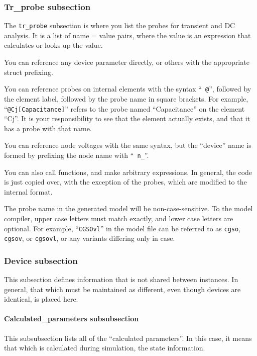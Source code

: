 \subsubsection{Tr\_probe subsection}

The {\tt tr\_probe} subsection is where you list the probes for
transient and DC analysis.  It is a list of name = value pairs, where
the value is an expression that calculates or looks up the value.

You can reference any device parameter directly, or others with the
appropriate struct prefixing.

You can reference probes on internal elements with the syntax ``{\tt
@}'', followed by the element label, followed by the probe name in
square brackets.  For example, ``{\tt @Cj[Capacitance]}'' refers to
the probe named ``Capacitance'' on the element ``Cj''.  It is your
responsibility to see that the element actually exists, and that it
has a probe with that name.

You can reference node voltages with the same syntax, but the
``device'' name is formed by prefixing the node name with ``{\tt
n\_}''.

You can also call functions, and make arbitrary expressions.  In
general, the code is just copied over, with the exception of the
probes, which are modified to the internal format.

The probe name in the generated model will be non-case-sensitive.  To
the model compiler, upper case letters must match exactly, and lower
case letters are optional.  For example, ``{\tt CGSOvl}'' in the model
file can be referred to as {\tt cgso}, {\tt cgsov}, or {\tt cgsovl},
or any variants differing only in case.
\subsubsection{Device subsection}

This subsection defines information that is not shared between
instances.  In general, that which must be maintained as different,
even though devices are identical, is placed here.

\paragraph{Calculated\_parameters subsubsection}

This subsubsection lists all of the ``calculated parameters''.  In
this case, it means that which is calculated during simulation, the
state information.

